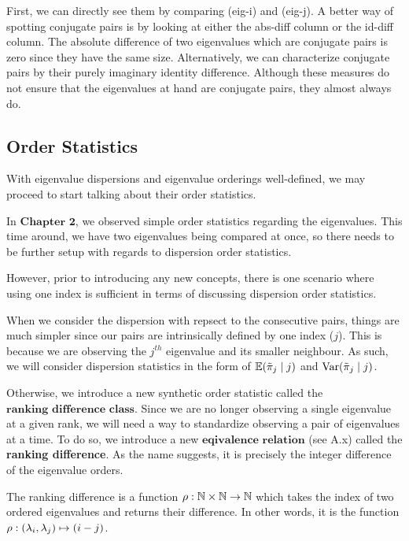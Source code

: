 First, we can directly see them by comparing (eig-i) and (eig-j). A better way of spotting conjugate pairs is by looking at either the abs-diff column or the id-diff column. The absolute difference of two eigenvalues which are conjugate pairs is zero since they have the same size. Alternatively, we can characterize conjugate pairs by their purely imaginary identity difference. Although these measures do not ensure that the eigenvalues at hand are conjugate pairs, they almost always do.

\subsection{Order Statistics}
With eigenvalue dispersions and eigenvalue orderings well-defined, we may proceed to start talking about their order statistics.

In $\textbf{Chapter 2}$, we observed simple order statistics regarding the eigenvalues. This time around, we have two eigenvalues being compared at once, so there needs to be further setup with regards to dispersion order statistics.

However, prior to introducing any new concepts, there is one scenario where using one index is sufficient in terms of discussing dispersion order statistics.

\begin{remark}
When we consider the dispersion with repsect to the consecutive pairs, things are much simpler since our pairs are intrinsically defined by one index ($j$). This is because we are observing the $j^{th}$ eigenvalue and its smaller neighbour. As such, we will consider dispersion statistics in the form of $\mathbb{E}({\tilde{\pi}}_j \mid j)$ and $\text{Var}({\tilde{\pi}}_j \mid j)$.
\end{remark}

Otherwise, we introduce a new synthetic order statistic called the $\textbf{ranking difference class}$. Since we are no longer observing a single eigenvalue at a given rank, we will need a way to standardize observing a pair of eigenvalues at a time. To do so, we introduce a new $\textbf{eqivalence relation}$ (see A.x) called the \textbf{ranking difference}. As the name suggests, it is precisely the integer difference of the eigenvalue orders.

\begin{definition}
The ranking difference is a function ${\rho}: \mathbb{N} \times \mathbb{N} \to \mathbb{N}$ which takes the index of two ordered eigenvalues and returns their difference. In other words, it is the function ${\rho}: (\lambda_i,\lambda_j) \mapsto (i - j)$.
\end{definition}


